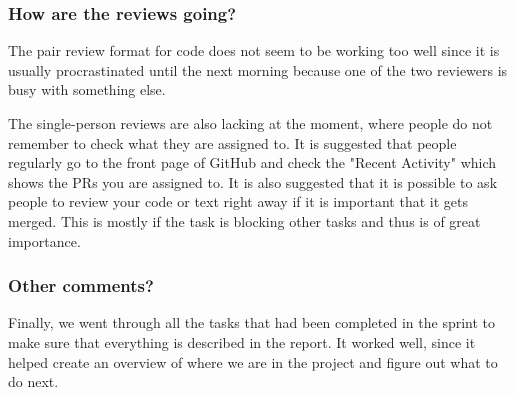 \subsubsection*{How are the reviews going?}
The pair review format for code does not seem to be working too well since it is usually procrastinated until the next morning because one of the two reviewers is busy with something else.

The single-person reviews are also lacking at the moment, where people do not remember to check what they are assigned to.
It is suggested that people regularly go to the front page of GitHub and check the "Recent Activity" which shows the PRs you are assigned to.
It is also suggested that it is possible to ask people to review your code or text right away if it is important that it gets merged.
This is mostly if the task is blocking other tasks and thus is of great importance.


\subsubsection*{Other comments?}
Finally, we went through all the tasks that had been completed in the sprint to make sure that everything is described in the report.
It worked well, since it helped create an overview of where we are in the project and figure out what to do next.
